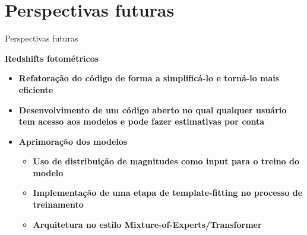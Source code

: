 \section{Perspectivas futuras}
\begin{frame}[c]{Perspectivas futuras}
    \begin{splusbox}{\textbf{Redshifts fotométricos}}
        \small
        \begin{itemize}
            \item \textbf{Refatoração do código de forma a simplificá-lo e torná-lo mais eficiente}
            \item \textbf{Desenvolvimento de um código aberto no qual qualquer usuário tem acesso aos modelos e pode fazer estimativas por conta}
            \item \textbf{Aprimoração dos modelos}
            \begin{itemize}
                \item \textbf{Uso de distribuição de magnitudes como input para o treino do modelo}
                \item \textbf{Implementação de uma etapa de template-fitting no processo de treinamento}
                \item \textbf{Arquitetura no estilo Mixture-of-Experts/Transformer}
            \end{itemize}
        \end{itemize}
    \end{splusbox}
\end{frame}


